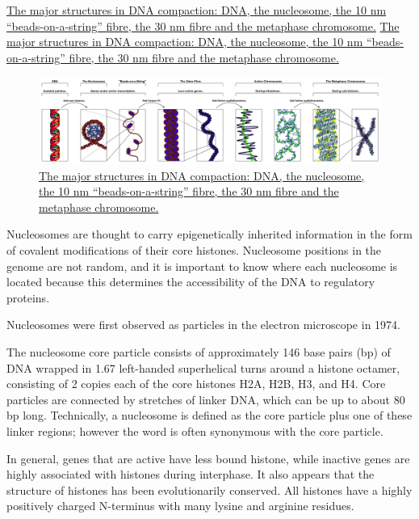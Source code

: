 \href{https://commons.wikimedia.org/wiki/File:Chromatin_Structures.png}{The major structures in DNA compaction: DNA, the nucleosome, the 10 nm ``beads-on-a-string'' fibre, the 30 nm fibre and the metaphase chromosome.} \href{https://commons.wikimedia.org/wiki/File:Chromatin_Structures.png}{The major structures in DNA compaction: DNA, the nucleosome, the 10 nm ``beads-on-a-string'' fibre, the 30 nm fibre and the metaphase chromosome.}

\begin{figure}

{\centering \includegraphics[width=0.7\linewidth]{./figures/chromosomes/Chromatin_Structures} 

}

\caption{\href{https://commons.wikimedia.org/wiki/File:Chromatin_Structures.png}{The major structures in DNA compaction: DNA, the nucleosome, the 10 nm ``beads-on-a-string'' fibre, the 30 nm fibre and the metaphase chromosome.}}\label{fig:structure}
\end{figure}

Nucleosomes are thought to carry epigenetically inherited information in the form of covalent modifications of their core histones. Nucleosome positions in the genome are not random, and it is important to know where each nucleosome is located because this determines the accessibility of the DNA to regulatory proteins.

Nucleosomes were first observed as particles in the electron microscope in 1974.

The nucleosome core particle consists of approximately 146 base pairs (bp) of DNA wrapped in 1.67 left-handed superhelical turns around a histone octamer, consisting of 2 copies each of the core histones H2A, H2B, H3, and H4. Core particles are connected by stretches of linker DNA, which can be up to about 80 bp long. Technically, a nucleosome is defined as the core particle plus one of these linker regions; however the word is often synonymous with the core particle.

In general, genes that are active have less bound histone, while inactive genes are highly associated with histones during interphase. It also appears that the structure of histones has been evolutionarily conserved. All histones have a highly positively charged N-terminus with many lysine and arginine residues.

